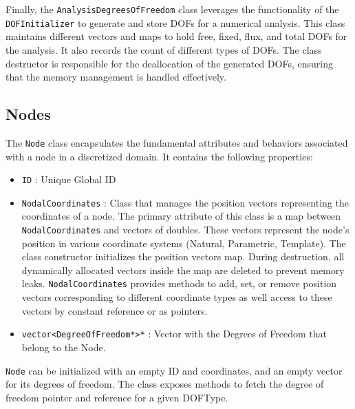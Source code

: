 \documentclass{article}
\begin{document}
	Finally, the \texttt{AnalysisDegreesOfFreedom} class leverages the functionality of the \texttt{DOFInitializer} to generate and store DOFs for a numerical analysis. This class maintains different vectors and maps to hold free, fixed, flux, and total DOFs for the analysis. It also records the count of different types of DOFs. The class destructor is responsible for the deallocation of the generated DOFs, ensuring that the memory management is handled effectively.	
	
	\subsection{Nodes}
	
	The \texttt{Node} class encapsulates the fundamental attributes and behaviors associated with a node in a discretized domain. It contains the following properties:
	\begin{itemize}
		\item \texttt{ID} : Unique Global ID
		
		\item \texttt{NodalCoordinates} : Class that manages the position vectors representing the coordinates of a node. The primary attribute of this class is a map between \texttt{NodalCoordinates} and vectors of doubles. These vectors represent the node's position in various coordinate systems (Natural, Parametric, Template). The class constructor initializes the position vectors map. During destruction, all dynamically allocated vectors inside the map are deleted to prevent memory leaks. \texttt{NodalCoordinates} provides methods to add, set, or remove position vectors corresponding to different coordinate types as well access to these vectors by constant reference or as pointers.
		
		\item \texttt{vector<DegreeOfFreedom*>*} : Vector with the Degrees of Freedom that belong to the Node.
		
	\end{itemize}
	
	\noindent \texttt{Node} can be initialized with an empty ID and coordinates, and an empty vector for its degrees of freedom. The class exposes methods to fetch the degree of freedom pointer and reference for a given DOFType. 
	
\end{document}
